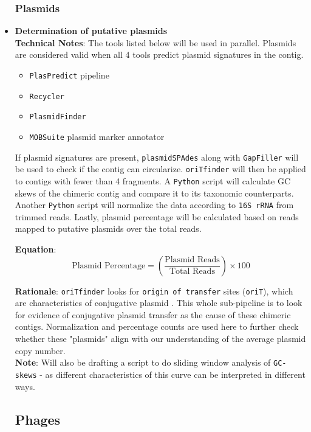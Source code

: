 \documentclass[11pt]{report}
\begin{document}
\begin{itemize}
\subsubsection{Plasmids}


	\item \textbf{Determination of putative plasmids}\\
	\textbf{Technical Notes}: The tools listed below will be used in parallel. Plasmids are considered valid when all 4 tools predict plasmid signatures in the contig.
	\begin{itemize}
		\item \texttt{PlasPredict} pipeline
		\item \texttt{Recycler}
		\item \texttt{PlasmidFinder}
		\item \texttt{MOBSuite} plasmid marker annotator
	\end{itemize}
	If plasmid signatures are present, \texttt{plasmidSPAdes} along with \texttt{GapFiller} will be used to check if the contig can circularize. \texttt{oriTfinder} will then be applied to contigs with fewer than 4 fragments. A \texttt{Python} script will calculate GC skews of the chimeric contig and compare it to its taxonomic counterparts. Another \texttt{Python} script will normalize the data according to \texttt{16S rRNA} from trimmed reads. Lastly, plasmid percentage will be calculated based on reads mapped to putative plasmids over the total reads.
	
	\textbf{Equation}:
	\[
	\text{Plasmid Percentage} = \left( \frac{\text{Plasmid Reads}}{\text{Total Reads}} \right) \times 100
	\]

	\textbf{Rationale}: \texttt{oriTfinder} looks for \texttt{origin of transfer} sites (\texttt{oriT}), which are characteristics of conjugative plasmid . This whole sub-pipeline is to look for evidence of conjugative plasmid transfer as the cause of these chimeric contigs. Normalization and percentage counts are used here to further check whether these "plasmids" align with our understanding of the average plasmid copy number. \\
	\textbf{Note}: Will also be drafting a script to do sliding window analysis of \texttt{GC-skews} - as different characteristics of this curve can be interpreted in different ways. 

\subsection{Phages}		
	

\end{itemize}
\end{document}

